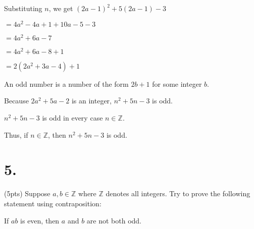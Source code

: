 \documentclass{article}
\newenvironment{Problem}
{\noindent\color{black}}
{\newline}
\newenvironment{Solution}
{\noindent\color{red}}
{\newline}
\begin{document}
\begin{Solution}
\begin{adjustwidth}{2em}{0em}
\begin{adjustwidth}{2em}{0em}
            Substituting $n$, we get $(2a - 1)^2+5(2a - 1) - 3$

            \hspace*{9em}$= 4a^2-4a+1+10a-5-3$

            \hspace*{9em}$= 4a^2+6a-7$

            \hspace*{9em}$= 4a^2+6a-8+1$

            \hspace*{9em}$=2(2a^2+3a-4)+1$

            \phantom{ }

            An odd number is a number of the form $2b + 1$
            for some integer $b$. 
            
            Because $2a^2 + 5a - 2$ is an
            integer, $n^2 + 5n - 3$ is odd. 
        \end{adjustwidth}

        \phantom{ }

        $n^2 + 5n - 3$ is odd in every case $n \in \mathbb Z$.

        \phantom{ }

        Thus, if $n \in \mathbb Z$, then $n^2 + 5n - 3$ is odd. 
    \end{adjustwidth}
    \phantom{ }
\end{Solution}

\vspace*{17em}

\section*{5. }

\begin{Problem}
    (5pts) Suppose $a, b \in \mathbb Z$ where $\mathbb Z$ denotes all integers. 
    Try to prove the following statement using contraposition:

    If $ab$ is even, then $a$ and $b$ are not both odd.
\end{Problem}
\end{document}
